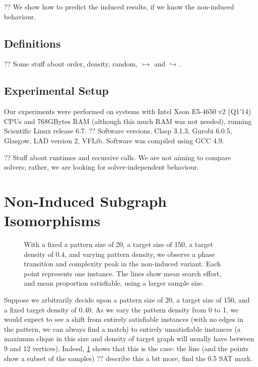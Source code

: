 \documentclass[letterpaper]{article}
\begin{document}
?? We show how to predict the induced results, if we know the non-induced behaviour.

\subsection{Definitions}

?? Some stuff about order, density, random, $\rightarrowtail$ and $\hookrightarrow$.

\lipsum[2]

\subsection{Experimental Setup}

Our experiments were performed on systems with Intel Xeon E5-4650 v2 (Q1'14) CPUs and 768GBytes RAM
(although this much RAM was not needed), running Scientific Linux release 6.7.   ?? Software
versions. Clasp 3.1.3, Gurobi 6.0.5, Glasgow, LAD version 2, VFLib. Software was compiled using GCC
4.9.

?? Stuff about runtimes and recursive calls. We are not aiming to compare solvers; rather, we are
looking for solver-independent behaviour.

\section{Non-Induced Subgraph Isomorphisms}

\begin{figure}[t]
    
    \caption{With a fixed a pattern size of 20, a target size of 150, a target density of 0.4, and
    varying pattern density, we observe a phase transition and complexity peak in the non-induced
    variant. Each point represents one instance. The lines show mean search effort, and mean
    proportion satisfiable, using a larger sample size.}
    \label{figure:phase-transition}
\end{figure}

Suppose we arbitrarily decide upon a pattern size of 20, a target size of 150, and a fixed target
density of 0.40. As we vary the pattern density from 0 to 1, we would expect to see a shift from
entirely satisfiable instances (with no edges in the pattern, we can always find a match) to
entirely unsatisfiable instances (a maximum clique in this size and density of target graph will
usually have between 9 and 12 vertices). Indeed, \cref{figure:phase-transition} shows that this is
the case: the line (and the points show a subset of the samples) ?? describe this a bit more, find
the 0.5 SAT mark.
\end{document}
